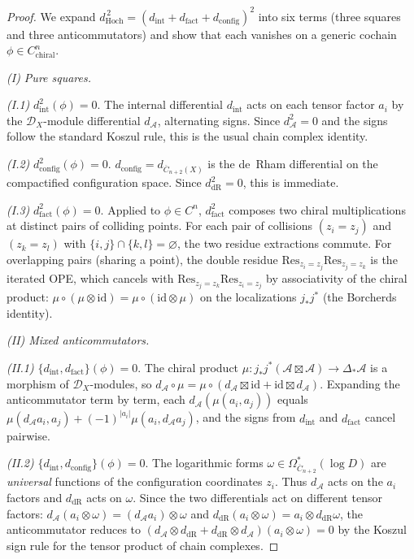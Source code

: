 \begin{proof}
We expand $d_{\mathrm{Hoch}}^{\,2}
= (d_{\text{int}} + d_{\text{fact}}
+ d_{\text{config}})^2$ into six terms (three squares and
three anticommutators) and show that each vanishes on a
generic cochain $\phi \in C^n_{\text{chiral}}$.

\emph{(I) Pure squares.}

\emph{(I.1)} $d_{\text{int}}^2(\phi) = 0$.
The internal differential $d_{\text{int}}$ acts on each
tensor factor $a_i$ by the $\mathcal{D}_X$-module differential
$d_\mathcal{A}$, alternating signs. Since $d_\mathcal{A}^2 = 0$
and the signs follow the standard Koszul rule, this is the
usual chain complex identity.

\emph{(I.2)} $d_{\text{config}}^2(\phi) = 0$.
$d_{\text{config}} = d_{\overline{C}_{n+2}(X)}$ is the
de~Rham differential on the compactified configuration space.
Since $d_{\mathrm{dR}}^2 = 0$, this is immediate.

\emph{(I.3)} $d_{\text{fact}}^2(\phi) = 0$.
Applied to $\phi \in C^n$, $d_{\text{fact}}^2$ composes two
chiral multiplications at distinct pairs of colliding points.
For each pair of collisions $(z_i = z_j)$ and $(z_k = z_l)$
with $\{i,j\} \cap \{k,l\} = \varnothing$, the two residue
extractions commute. For overlapping pairs (sharing a point),
the double residue
$\mathrm{Res}_{z_i = z_j}\mathrm{Res}_{z_j = z_k}$ is the
iterated OPE, which cancels with
$\mathrm{Res}_{z_j = z_k}\mathrm{Res}_{z_i = z_j}$ by
associativity of the chiral product: $\mu \circ (\mu \otimes
\mathrm{id}) = \mu \circ (\mathrm{id} \otimes \mu)$ on the
localizations $j_*j^*$ (the Borcherds identity).

\emph{(II) Mixed anticommutators.}

\emph{(II.1)} $\{d_{\text{int}}, d_{\text{fact}}\}(\phi) = 0$.
The chiral product $\mu\colon j_*j^*(\mathcal{A} \boxtimes
\mathcal{A}) \to \Delta_*\mathcal{A}$ is a morphism of
$\mathcal{D}_X$-modules, so $d_\mathcal{A} \circ \mu =
\mu \circ (d_\mathcal{A} \boxtimes \mathrm{id} +
\mathrm{id} \boxtimes d_\mathcal{A})$. Expanding the
anticommutator term by term, each
$d_\mathcal{A}(\mu(a_i, a_j))$ equals
$\mu(d_\mathcal{A} a_i, a_j) + (-1)^{|a_i|}
\mu(a_i, d_\mathcal{A} a_j)$,
and the signs from $d_{\text{int}}$ and $d_{\text{fact}}$
cancel pairwise.

\emph{(II.2)} $\{d_{\text{int}}, d_{\text{config}}\}(\phi) = 0$.
The logarithmic forms
$\omega \in \Omega^*_{\overline{C}_{n+2}}(\log D)$
are \emph{universal} functions of the configuration coordinates
$z_i$.  Thus $d_\mathcal{A}$ acts on the $a_i$ factors and
$d_{\mathrm{dR}}$ acts on $\omega$. Since the
two differentials act on different tensor factors:
$d_\mathcal{A}(a_i \otimes \omega) =
(d_\mathcal{A} a_i) \otimes \omega$ and
$d_{\mathrm{dR}}(a_i \otimes \omega) =
a_i \otimes d_{\mathrm{dR}}\omega$,
the anticommutator reduces to
$(d_\mathcal{A} \otimes d_{\mathrm{dR}} +
d_{\mathrm{dR}} \otimes d_\mathcal{A})(a_i \otimes \omega)
= 0$ by the Koszul sign rule for the tensor product of
chain complexes.


\end{proof}
